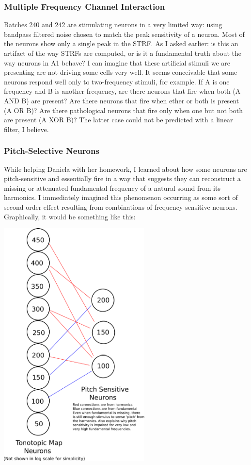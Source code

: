 \documentclass[11pt]{article}
\begin{document}
\subsubsection{Multiple Frequency Channel Interaction}
\label{sec-2.1.3}


    Batches 240 and 242 are stimulating neurons in a very limited way: using bandpass filtered noise chosen to match the peak sensitivity of a neuron. Most of the neurons show only a single peak in the STRF. As I asked earlier: is this an artifact of the way STRFs are computed, or is it a fundamental truth about the way neurons in A1 behave? I can imagine that these artificial stimuli we are presenting are not driving some cells very well. It seems conceivable that some neurons respond well only to two-frequency stimuli, for example. If A is one frequency and B is another frequency, are there neurons that fire when both (A AND B) are present? Are there neurons that fire when ether or both is present (A OR B)? Are there pathological neurons that fire only when one but not both are present (A XOR B)? The latter case could not be predicted with a linear filter, I believe.

\subsubsection{Pitch-Selective Neurons}
\label{sec-2.1.4}


    While helping Daniela with her homework, I learned about how some neurons are pitch-sensitive and essentially fire in a way that suggests they can reconstruct a missing or attenuated fundamental frequency of a natural sound from its harmonics. I immediately imagined this phenomenon occurring as some sort of second-order effect resulting from combinations of frequency-sensitive neurons. Graphically, it would be something like this:
    
    \begin{center}\includegraphics[height=5in]{pitch-sensitive-neurons.pdf}\end{center}
\end{document}
